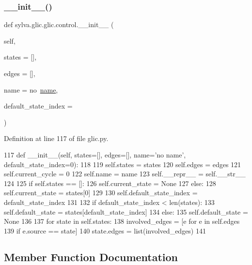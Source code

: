 \subsubsection{\texorpdfstring{\+\_\+\+\_\+init\+\_\+\+\_\+()}{\_\_init\_\_()}}
{\footnotesize\ttfamily def sylva.\+glic.\+glic.\+control.\+\_\+\+\_\+init\+\_\+\+\_\+ (\begin{DoxyParamCaption}\item[{}]{self,  }\item[{}]{states = {\ttfamily \mbox{[}\mbox{]}},  }\item[{}]{edges = {\ttfamily \mbox{[}\mbox{]}},  }\item[{}]{name = {\ttfamily \textquotesingle{}no~\hyperlink{classsylva_1_1glic_1_1glic_1_1control_a95f657f58c1799fe7004653fe77ce106}{name}\textquotesingle{}},  }\item[{}]{default\+\_\+state\+\_\+index = {} }\end{DoxyParamCaption})}



Definition at line 117 of file glic.\+py.


\begin{DoxyCode}
117         \textcolor{keyword}{def }\_\_init\_\_(self, states=[], edges=[], name='no name', default\_state\_index=0):
118 
119             self.states = states
120             self.edges = edges
121             self.current\_cycle = 0
122             self.name = name
123             self.\_\_repr\_\_ = self.\_\_str\_\_
124 
125             \textcolor{keywordflow}{if} self.states == []:
126                 self.current\_state = \textcolor{keywordtype}{None}
127             \textcolor{keywordflow}{else}:
128                 self.current\_state = states[0]
129 
130             self.default\_state\_index = default\_state\_index
131 
132             \textcolor{keywordflow}{if} default\_state\_index < len(states):
133                 self.default\_state = states[default\_state\_index]
134             \textcolor{keywordflow}{else}:
135                 self.default\_state = \textcolor{keywordtype}{None}
136 
137             \textcolor{keywordflow}{for} state \textcolor{keywordflow}{in} self.states:
138                 involved\_edges = [e \textcolor{keywordflow}{for} e \textcolor{keywordflow}{in} self.edges
139                                   \textcolor{keywordflow}{if} e.source == state]
140                 state.edges = list(involved\_edges)
141 
\end{DoxyCode}


\subsection{Member Function Documentation}
\mbox{\label{classsylva_1_1glic_1_1glic_1_1control_a930531b0935008d702bf22e2307283c6}} 
